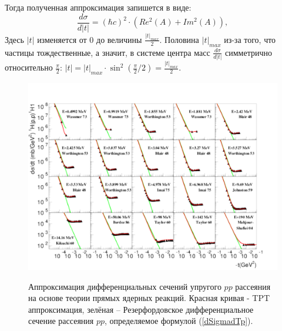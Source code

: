 \documentclass[a4paper,12pt]{article}
\begin{document}
\begin{large}
Тогда полученная аппроксимация запишется в виде:
\begin{equation}
 \label{Finddp}     
      \frac{d\sigma}{d|t|}=\left( \hbar c\right)^2 \cdot \left( Re^2(A)+Im^2(A) \right),
\end{equation}
  Здесь $|t|$ изменяется от 0 до величины $\frac{|t|_{max}}{2}$.
  Половина $|t|_{max}$ из-за того, что частицы тождественные, а значит, в системе центра масс $\frac{d\sigma}{d|t|}$ симметрично относительно $\frac{\pi}{2}$: $|t|=|t|_{max}\cdot \sin^2{\left(\frac{\pi}{2}/2 \right)}=\frac{|t|_{max}}{2}$.

\begin{figure}[ht]
  {
       \includegraphics[width=0.99\linewidth]{images/pp}
  }
  \caption{Аппроксимация дифференциальных сечений упругого $pp$ рассеяния \cite{PP1_Wassmer,PP2_Worthigton,PP3_Blair,PP4_Imai,PP5_Johnston,PP6_Kikuchi,PP7_Berdoz,
 PP8_Taylor,PP9_Mahjour} на основе теории прямых ядерных реакций. Красная кривая - TPT аппроксимация, зелёная -- Резерфордовское дифференциальное сечение рассеяния $pp$, определяемое формулой (\ref{dSigmadTp}).}
  \label{fig:pp}
\end{figure}


\end{large}
\end{document}
